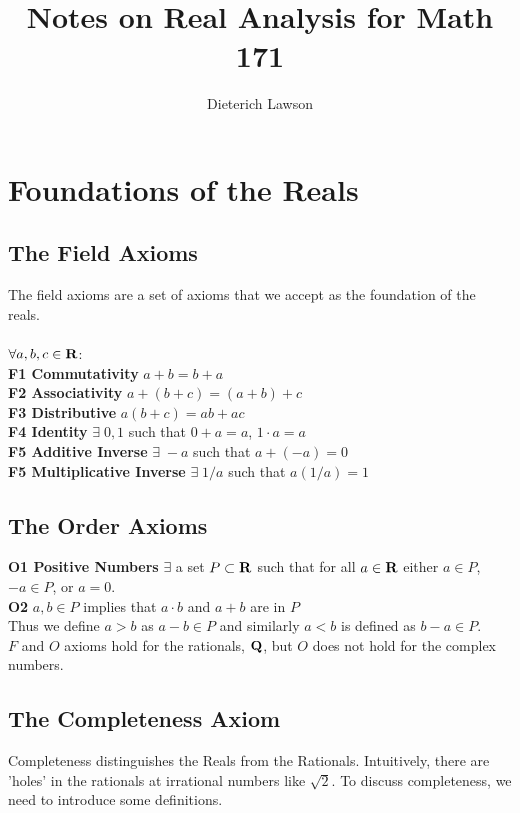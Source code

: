 \documentclass[12pt]{article}
\title{Notes on Real Analysis for Math 171}
\author{Dieterich Lawson}
\begin{document}
\maketitle
\tableofcontents
\listoftodos
\newpage
\section{Foundations of the Reals}
  \subsection{The Field Axioms}
    The field axioms are a set of axioms that we accept as the foundation of the reals.\\\\
    $\forall a,b,c \in \mathbf{R}$:\\

    \textbf{F1 Commutativity}   $a+b = b+a$\\
    \textbf{F2 Associativity}  $a+(b +c) = (a+b)+c$\\
    \textbf{F3 Distributive}  $a(b +c) = ab+ac$\\
    \textbf{F4 Identity}  $\exists\;0,1$ such that $0 + a = a$, $1 \cdot a = a$ \\
    \textbf{F5 Additive Inverse}  $\exists\;-a$ such that $a + (-a) = 0$\\
    \textbf{F5 Multiplicative Inverse}  $\exists\;1/a$ such that $a(1/a) = 1$
  \subsection{The Order Axioms}
    \textbf{O1 Positive Numbers} $\exists$ a set $P \subset \mathbf {\mathbf{R}}$ such that for all $a \in \mathbf{R}$ either
    $a \in P$, $-a \in P$, or $a = 0$.\\
    \textbf{O2} $a,b \in P$ implies that $a\cdot b$ and $a + b$ are in $P$\\

    Thus we define $a > b$ as $a - b \in P$ and similarly $a < b$ is defined as $b - a \in P$.\\

    $F$ and $O$ axioms hold for the rationals, $\mathbf{Q}$, but $O$ does not hold for the complex numbers.
  \subsection{The Completeness Axiom}
    Completeness distinguishes the Reals from the Rationals. Intuitively, there are 'holes' in the rationals at
    irrational numbers like $\sqrt{2}$. To discuss completeness, we need to introduce some definitions.\\
\end{document}
